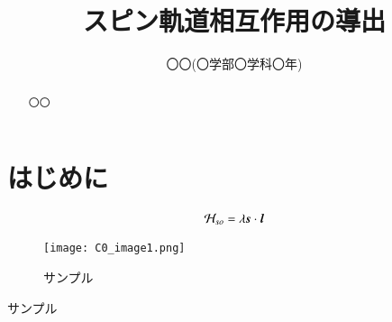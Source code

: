\documentclass[a4paper,11pt]{jsarticle}
\numberwithin{equation}{section}
\newcommand{\bvec}[1]{\mbox{\boldmath $#1$}}
\begin{document}
\title{スピン軌道相互作用の導出}
\author{〇〇(〇学部〇学科〇年)}
\date{}
\maketitle

\setcounter{section}{0}

\begin{abstract}
  〇〇
\end{abstract} 

\section{はじめに}

\begin{align}
  \mathcal{H} _{so} =\lambda \bvec{s}\cdot \bvec{l}
\end{align}

\begin{wrapfigure}{r}[0pt]{0.4\textwidth}
  \centering
    \texttt{[image: C0\_image1.png]}
  \caption{サンプル}
  \label{fig:1}
 \end{wrapfigure}


\begin{thebibliography}{99}
  サンプル
\end{thebibliography}
\end{document}
